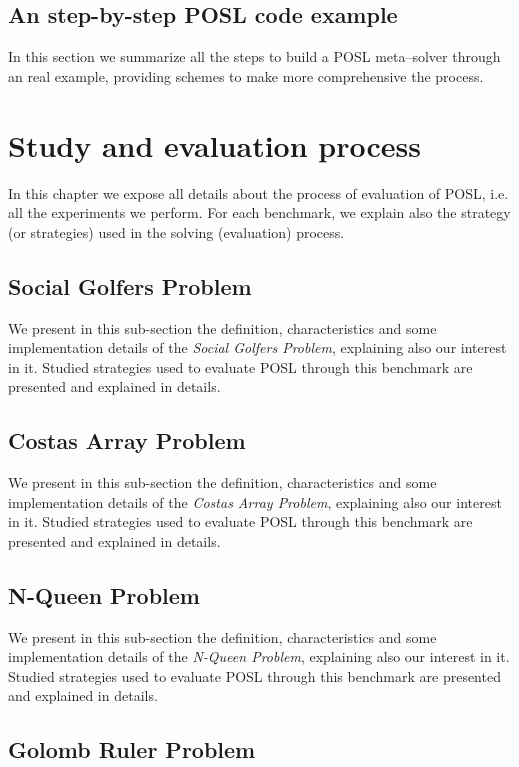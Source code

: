 \documentclass[a4paper]{book} %
\newcommand{\posl}{{\sc POSL}}
\begin{document}
\section{An step-by-step \posl{} code example}

In this section we summarize all the steps to build a \posl{} meta--solver through an real example, providing schemes to make more comprehensive the process.

\chapter{Study and evaluation process}

In this chapter we expose all details about the process of evaluation of \posl{}, i.e. all the experiments we perform. For each benchmark, we explain also the strategy (or strategies) used in the solving (evaluation) process.

\newcommand{\benchbody}[1]{We present in this sub-section the definition, characteristics and some implementation details of the \textit{#1 Problem}, explaining also our interest in it. Studied strategies used to evaluate \posl{} through this benchmark are presented and explained in details.}

\section{Social Golfers Problem}

\benchbody{Social Golfers}

\section{Costas Array Problem}

\benchbody{Costas Array}

\section{N-Queen Problem}

\benchbody{N-Queen}

\section{Golomb Ruler Problem}
\end{document}
